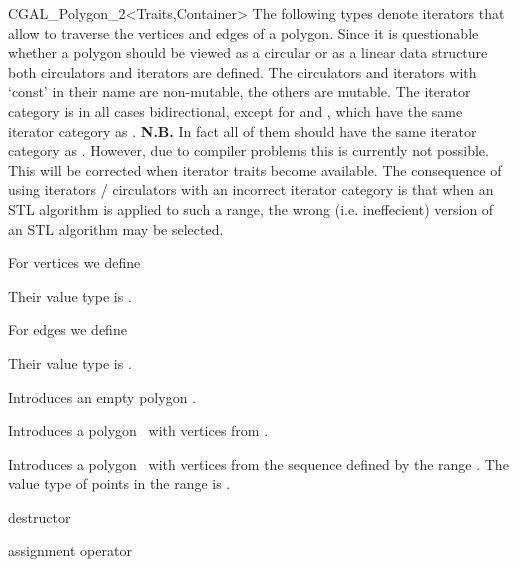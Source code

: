 \begin{ccClassTemplate}{CGAL_Polygon_2<Traits,Container>}
The following types denote iterators that allow to traverse the vertices and
edges of a polygon. 
Since it is questionable whether a polygon should be viewed as a circular or 
as a linear data structure both circulators and iterators are defined.
The circulators and iterators with `const' in their name are non-mutable, the 
others are mutable.
The iterator category is in all cases bidirectional, except for
 and , which have the
same iterator category as .
{\bf N.B.} In fact all of them should have the same iterator category as
. However, due to compiler problems this is currently
not possible. This will be corrected when iterator traits become available.
The consequence of using iterators / circulators with an incorrect iterator
category is that when an STL algorithm is applied to such a range,
the wrong (i.e. ineffecient) version of an STL algorithm may be selected. 

For vertices we define


Their value type is .

For edges we define


Their value type is .

\ccCreation
{}

  \ccHidden{}
    { Introduces an empty polygon \ccVar.}

  \ccHidden{}
    { Introduces a polygon \ccVar\ with vertices from .}

    { Introduces a polygon \ccVar\ with vertices from the sequence defined by
      the range \ccStyle{[first,last)}.
      \ccPrecond The value type of points in the range \ccStyle{[first,last)} is
                 .
    }

  \ccHidden{}
  { destructor }

  \ccHidden{}
  {assignment operator}


\end{ccClassTemplate}
